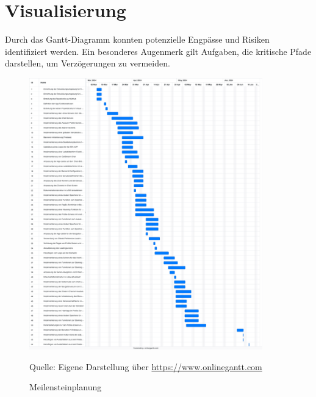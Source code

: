 \section{Visualisierung}
Durch das Gantt-Diagramm konnten potenzielle Engpässe und Risiken identifiziert werden.
Ein besonderes Augenmerk gilt Aufgaben, die kritische Pfade darstellen, um Verzögerungen zu vermeiden.

\begin{figure}[H]
    \setcounter{figure}{2} 
    \caption[Meilensteinplanung]{Meilensteinplanung}
	\centering
	\includegraphics[width=0.9\textwidth]{assets/figures/STH GANTT Diagramm.png}
	\begin{flushleft}
		Quelle: Eigene Darstellung über \url{https://www.onlinegantt.com}
	\end{flushleft}
\end{figure}
